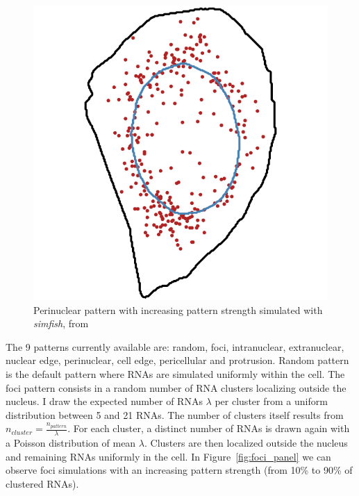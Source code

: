 \begin{figure}[]
	\endminipage\hfill
		\includegraphics[width=\linewidth]{figures/chapter4/simulation_perinuclear_90}
	\endminipage
	\caption[Simulated perinuclear patterns]{Perinuclear pattern with increasing pattern strength simulated with \emph{simfish}, from~\cite{pointfish_2022}}
	\label{fig:perinuclear_panel}
\end{figure}

The 9 patterns currently available are: random, foci, intranuclear, extranuclear, nuclear edge, perinuclear, cell edge, pericellular and protrusion.
Random pattern is the default pattern where \ac{RNA}s are simulated uniformly within the cell.
The foci pattern consists in a random number of \ac{RNA} clusters localizing outside the nucleus.
I draw the expected number of \ac{RNA}s $\lambda$ per cluster from a uniform distribution between 5 and 21 \ac{RNA}s.
The number of clusters itself results from $n_{cluster}= \frac{n_{pattern}}{\lambda}$.
For each cluster, a distinct number of \ac{RNA}s is drawn again with a Poisson distribution of mean $\lambda$.
Clusters are then localized outside the nucleus and remaining \ac{RNA}s uniformly in the cell.
In Figure~\ref{fig:foci_panel} we can observe foci simulations with an increasing pattern strength (from 10\% to 90\% of clustered \ac{RNA}s).

